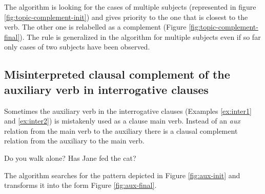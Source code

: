     The algorithm is looking for the cases of multiple subjects (represented in figure \ref{fig:topic-complement-init}) and gives priority to the one that is closest to the verb. The other one is relabelled as a complement (Figure \ref{fig:topic-complement-final}). The rule is generalized in the algorithm for multiple subjects even if so far only cases of two subjects have been observed.  

\subsection{Misinterpreted clausal complement of the auxiliary verb in interrogative clauses}
    Sometimes the auxiliary verb in the interrogative clauses (Examples \ref{ex:inter1} and \ref{ex:inter2}) is mistakenly used as a clause main verb. Instead of an \textit{aux} relation from the main verb to the auxiliary there is a clausal complement relation from the auxiliary to the main verb.

    \begin{exe}
    	\ex\label{ex:inter1} Do you walk alone?
    	\ex\label{ex:inter2} Has Jane fed the cat?
    \end{exe}

    The algorithm searches for the pattern depicted in Figure \ref{fig:aux-init} and transforms it into the form Figure \ref{fig:aux-final}. 

